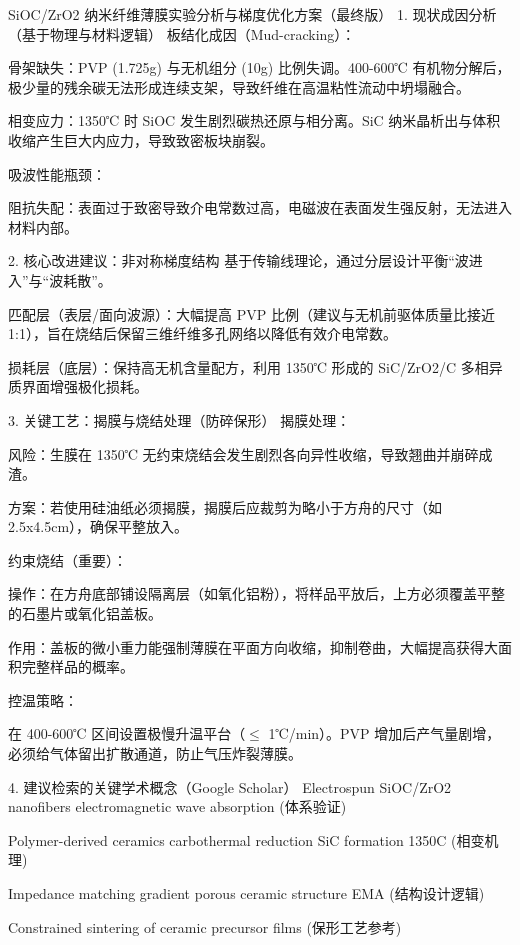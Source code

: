 SiOC/ZrO2 纳米纤维薄膜实验分析与梯度优化方案（最终版）
1. 现状成因分析（基于物理与材料逻辑）
板结化成因（Mud-cracking）：

骨架缺失：PVP (1.725g) 与无机组分 (10g) 比例失调。400-600℃ 有机物分解后，极少量的残余碳无法形成连续支架，导致纤维在高温粘性流动中坍塌融合。

相变应力：1350℃ 时 SiOC 发生剧烈碳热还原与相分离。SiC 纳米晶析出与体积收缩产生巨大内应力，导致致密板块崩裂。

吸波性能瓶颈：

阻抗失配：表面过于致密导致介电常数过高，电磁波在表面发生强反射，无法进入材料内部。

2. 核心改进建议：非对称梯度结构
基于传输线理论，通过分层设计平衡“波进入”与“波耗散”。

匹配层（表层/面向波源）：大幅提高 PVP 比例（建议与无机前驱体质量比接近 1:1），旨在烧结后保留三维纤维多孔网络以降低有效介电常数。

损耗层（底层）：保持高无机含量配方，利用 1350℃ 形成的 SiC/ZrO2/C 多相异质界面增强极化损耗。

3. 关键工艺：揭膜与烧结处理（防碎保形）
揭膜处理：

风险：生膜在 1350℃ 无约束烧结会发生剧烈各向异性收缩，导致翘曲并崩碎成渣。

方案：若使用硅油纸必须揭膜，揭膜后应裁剪为略小于方舟的尺寸（如 2.5x4.5cm），确保平整放入。

约束烧结（重要）：

操作：在方舟底部铺设隔离层（如氧化铝粉），将样品平放后，上方必须覆盖平整的石墨片或氧化铝盖板。

作用：盖板的微小重力能强制薄膜在平面方向收缩，抑制卷曲，大幅提高获得大面积完整样品的概率。

控温策略：

在 400-600℃ 区间设置极慢升温平台（$\le$ 1℃/min）。PVP 增加后产气量剧增，必须给气体留出扩散通道，防止气压炸裂薄膜。

4. 建议检索的关键学术概念（Google Scholar）
Electrospun SiOC/ZrO2 nanofibers electromagnetic wave absorption (体系验证)

Polymer-derived ceramics carbothermal reduction SiC formation 1350C (相变机理)

Impedance matching gradient porous ceramic structure EMA (结构设计逻辑)

Constrained sintering of ceramic precursor films (保形工艺参考)